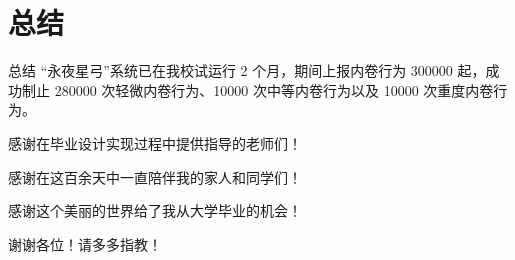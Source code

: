 %
%
%
%
\section{总结}
    \begin{frame}{总结}
        “永夜星弓”系统已在我校试运行 2 个月，期间上报内卷行为 300000 起，成功制止 280000 次轻微内卷行为、10000 次中等内卷行为以及 10000 次重度内卷行为。\cite{qin2021}

        \begin{center}
            感谢在毕业设计实现过程中提供指导的老师们！

            感谢在这百余天中一直陪伴我的家人和同学们！

            感谢这个美丽的世界给了我从大学毕业的机会！
        \end{center}

        \begin{center}
            谢谢各位！请多多指教！
        \end{center}
    \end{frame}